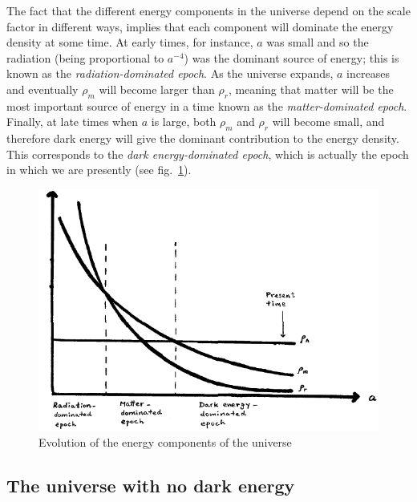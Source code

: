 \documentclass[11pt, a4paper,oneside,openright]{book}
\numberwithin{equation}{section}
\begin{document}
The fact that the different energy components in the universe depend on the scale factor in different ways, implies that each component will dominate the energy density at some time. At early times, for instance, $a$ was small and so the radiation (being proportional to $a^{-4}$) was the dominant source of energy; this is known as the {\it radiation-dominated epoch}. As the universe expands, $a$ increases and eventually $\rho_m$ will become larger than $\rho_r$, meaning that matter will be the most important source of energy in a time known as the {\it matter-dominated epoch}. Finally, at late times when $a$ is large, both $\rho_m$ and $\rho_r$ will become small, and therefore dark energy will give the dominant contribution to the energy density. This corresponds to the {\it dark energy-dominated epoch}, which is actually the epoch in which we are presently (see fig.\ \ref{fig:lec6_2}).
\begin{figure}[ht]
\begin{center}
\includegraphics[scale=0.6]{Draw/lec6_2.png}
\end{center}
\caption{Evolution of the energy components of the universe}
\label{fig:lec6_2}
\end{figure}

\subsection{The universe with no dark energy}
\end{document}
